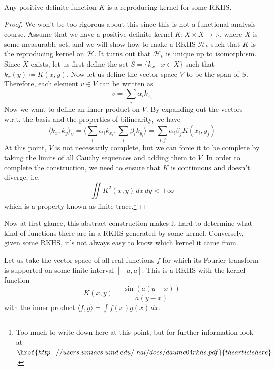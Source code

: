 \documentclass{article}
\begin{document}
  \begin{theorem} 
    Any positive definite function $K$ is a reproducing kernel for some RKHS.  
  \end{theorem} 
  \begin{proof} 
    We won't be too rigorous about this since this is not a functional analysis course. Assume that we have a positive definite kernel $K: X \times X \rightarrow \mathbb{R}$, where $X$ is some measurable set, and we will show how to make a RKHS $\mathcal{H}_k$ such that $K$ is the reproducing kernel on $\mathcal{H}$. It turns out that $\mathcal{H}_k$ is unique up to isomorphism. Since $X$ exists, let us first define the set $S = \{ k_x \mid x \in X\}$ such that $k_x (y) \coloneqq K(x, y)$. Now let us define the vector space $V$ to be the span of $S$. Therefore, each element $v \in V$ can be written as 
    \[v = \sum_i \alpha_i k_{x_i}\]
    Now we want to define an inner product on $V$. By expanding out the vectors w.r.t. the basis and the properties of bilinearity, we have 
    \[\langle k_x, k_y \rangle_{V} = \bigg\langle \sum_i \alpha_i k_{x_i} , \sum_i \beta_i k_{y_i} \bigg\rangle = \sum_{i, j} \alpha_i \beta_j K(x_i, y_j)\] 
    At this point, $V$ is not necessarily complete, but we can force it to be complete by taking the limits of all Cauchy sequences and adding them to $V$. In order to complete the construction, we need to ensure that $K$ is continuous and doesn't diverge, i.e. 
    \[\iint K^2 (x, y) \,dx\,dy < +\infty\]
    which is a property known as finite trace.\footnote{Too much to write down here at this point, but for further information look at $\href{http://users.umiacs.umd.edu/~hal/docs/daume04rkhs.pdf}{the article here}$.}
  \end{proof}

  Now at first glance, this abstract construction makes it hard to determine what kind of functions there are in a RKHS generated by some kernel. Conversely, given some RKHS, it's not always easy to know which kernel it came from. 

  \begin{example}
    Let us take the vector space of all real functions $f$ for which its Fourier transform is supported on some finite interval $[-a, a]$. This is a RKHS with the kernel function 
    \begin{equation}
      K(x, y) = \frac{\sin(a(y - x))}{a(y - x)}
    \end{equation}
    with the inner product $\langle f, g \rangle = \int f(x) g(x) \,dx$.
  \end{example}
\end{document}
